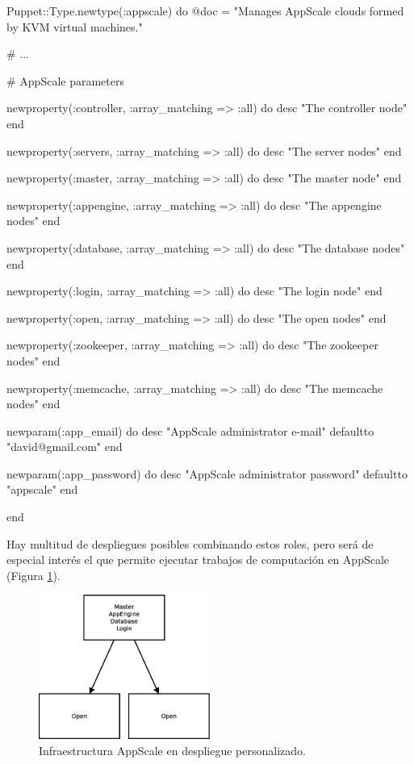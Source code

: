\begin{rubycode}
Puppet::Type.newtype(:appscale) do
   @doc = "Manages AppScale clouds formed by KVM virtual machines."
   
   # ...

   # AppScale parameters
   
   newproperty(:controller, :array_matching => :all) do
      desc "The controller node"
   end

   newproperty(:servers, :array_matching => :all) do
      desc "The server nodes"
   end


   newproperty(:master, :array_matching => :all) do
      desc "The master node"
   end

   newproperty(:appengine, :array_matching => :all) do
      desc "The appengine nodes"
   end

   newproperty(:database, :array_matching => :all) do
      desc "The database nodes"
   end

   newproperty(:login, :array_matching => :all) do
      desc "The login node"
   end

   newproperty(:open, :array_matching => :all) do
      desc "The open nodes"
   end

   newproperty(:zookeeper, :array_matching => :all) do
      desc "The zookeeper nodes"
   end

   newproperty(:memcache, :array_matching => :all) do
      desc "The memcache nodes"
   end
   

   newparam(:app_email) do
      desc "AppScale administrator e-mail"
      defaultto "david@gmail.com"
   end
   
   newparam(:app_password) do
      desc "AppScale administrator password"
      defaultto "appscale"
   end

end
\end{rubycode}

Hay multitud de despliegues posibles combinando estos roles, pero será de especial interés el que permite ejecutar trabajos de computación en AppScale (Figura \ref{figure:arquitectura-appscale}).

\begin{figure} [!htbp]
  \centering
  \includegraphics[width=0.5\textwidth]{figuras/Arquitectura_AppScale.eps}
  \caption{Infraestructura AppScale en despliegue personalizado.}
\label{figure:arquitectura-appscale}
\end{figure}

